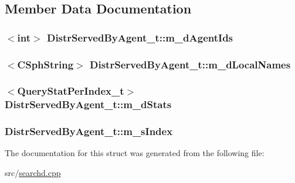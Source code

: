 \subsection{Member Data Documentation}
\hypertarget{structDistrServedByAgent__t_a874e0aa1414b93ac0ee8836bbe94c89c}{
\subsubsection[{m\-\_\-d\-Agent\-Ids}]{$<${\bf int}$>$ Distr\-Served\-By\-Agent\-\_\-t\-::m\-\_\-d\-Agent\-Ids}}\label{structDistrServedByAgent__t_a874e0aa1414b93ac0ee8836bbe94c89c}
\hypertarget{structDistrServedByAgent__t_a1b4c2aab2f3fb2b07c78374cd5fecca4}{
\subsubsection[{m\-\_\-d\-Local\-Names}]{$<${\bf C\-Sph\-String}$>$ Distr\-Served\-By\-Agent\-\_\-t\-::m\-\_\-d\-Local\-Names}}\label{structDistrServedByAgent__t_a1b4c2aab2f3fb2b07c78374cd5fecca4}
\hypertarget{structDistrServedByAgent__t_a5fc98a349750ce0df1cd9ea3caeb2b7f}{
\subsubsection[{m\-\_\-d\-Stats}]{$<${\bf Query\-Stat\-Per\-Index\-\_\-t}$>$ Distr\-Served\-By\-Agent\-\_\-t\-::m\-\_\-d\-Stats}}\label{structDistrServedByAgent__t_a5fc98a349750ce0df1cd9ea3caeb2b7f}
\hypertarget{structDistrServedByAgent__t_a25f85eefcb7c2ae4b575e961b3ef54b0}{
\subsubsection[{m\-\_\-s\-Index}]{ Distr\-Served\-By\-Agent\-\_\-t\-::m\-\_\-s\-Index}}\label{structDistrServedByAgent__t_a25f85eefcb7c2ae4b575e961b3ef54b0}


The documentation for this struct was generated from the following file\-:\begin{DoxyCompactItemize}
\item 
src/\hyperlink{searchd_8cpp}{searchd.\-cpp}\end{DoxyCompactItemize}
